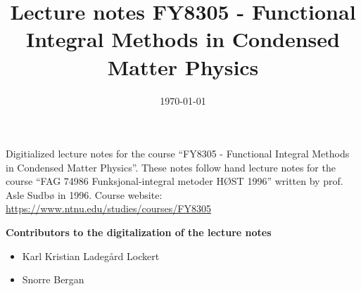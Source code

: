 \documentclass{article}
\title{Lecture notes FY8305 - Functional Integral Methods in Condensed Matter Physics}
\date{\today}
\theoremstyle{definition}
\newcommand{\contribs}{%
\begin{center}
\large 
\textbf{Contributors to the digitalization of the lecture notes}
\end{center}
\begin{itemize}
\item Karl Kristian Ladegård Lockert
\item Snorre Bergan
\end{itemize}

}
\begin{document}
\maketitle
\newpage
Digitialized lecture notes for the course ``FY8305 - Functional Integral Methods in Condensed Matter Physics''.
These notes follow hand lecture notes for the course ``FAG 74986 Funksjonal-integral metoder HØST 1996'' written by prof. Asle Sudbø in 1996.
Course website: \href{https://www.ntnu.edu/studies/courses/FY8305}{https://www.ntnu.edu/studies/courses/FY8305}
\contribs
\tableofcontents








%
%







%




\end{document}
